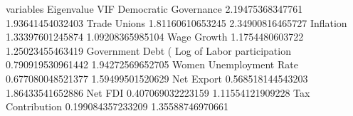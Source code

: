 variables	Eigenvalue	VIF
Democratic Governance	2.19475368347761	1.93641454032403
Trade Unions	1.81160610653245	2.34900816465727
Inflation	1.33397601245874	1.09208365985104
Wage Growth	1.1754480603722	1.25023455463419
Government Debt (%
Log of Labor participation	0.790919530961442	1.94272569652705
Women Unemployment Rate	0.677080048521377	1.59499501520629
Net Export	0.568518144543203	1.86433541652886
Net FDI	0.407069032223159	1.11554121909228
Tax Contribution	0.199084357233209	1.35588746970661
